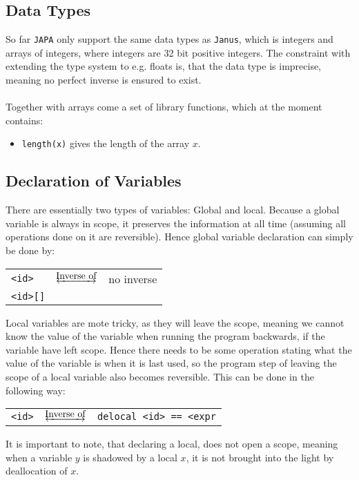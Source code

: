 \subsection{Data Types}
So far \texttt{JAPA} only support the same data types as \texttt{Janus}, which is
integers and arrays of integers, where integers are 32 bit positive integers.
The constraint with extending the type system to
e.g. floats is, that the data type is imprecise, meaning no perfect inverse is ensured
to exist.
\\
\\
Together with arrays come a set of library functions, which at the moment contains:

\begin{itemize}
    \item \texttt{length(x)} gives the length of the array $x$.
\end{itemize}

\subsection{Declaration of Variables}
There are essentially two types of variables: Global and local. Because a global variable is
always in scope, it preserves the information at all time (assuming all operations done on it
are reversible). Hence global variable declaration can simply be done by:

\begin{table*}[h]
    \centering
    \begin{tabular}{lcl}
        \texttt{<id>} & $\underleftrightarrow{\text{Inverse of}}$ & no inverse \\
        \texttt{<id>[]}
    \end{tabular}
\end{table*}
\noindent
Local variables are mote tricky, as they will leave the scope, meaning we cannot know the value
of the variable when running the program backwards, if the variable have left scope. Hence there
needs to be some operation stating what the value of the variable is when it is last used, so
the program step of leaving the scope of a local variable also becomes reversible. This can be
done in the following way:

\begin{table*}[h]
    \centering
    \begin{tabular}{lcl}
        \texttt{<id>} & $\underleftrightarrow{\text{Inverse of}}$ & \texttt{delocal <id> == <expr}
    \end{tabular}
\end{table*}
\noindent
It is important to note, that declaring a local, does not open a scope, meaning when a variable
$y$ is shadowed by a local $x$, it is not brought into the light by deallocation of $x$.

